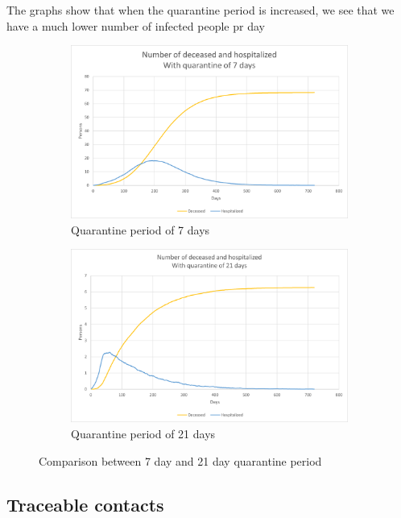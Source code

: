 The graphs show that when the quarantine period is increased, we see that we have a much lower number of infected people pr day




\begin{figure}[H]
\centering
\begin{subfigure}{.5\textwidth}
  \centering
  \includegraphics[width=.95\linewidth]{0_billeder/CT_HOS_7.png}
  \caption{Quarantine period of 7 days}
  \label{fig:sub1}
\end{subfigure}%
\begin{subfigure}{.5\textwidth}
  \centering
  \includegraphics[width=.95\linewidth]{0_billeder/CT_HOS_21.png}
  \caption{Quarantine period of 21 days}
  \label{fig:sub2}
\end{subfigure}
\caption{Comparison between 7 day and 21 day quarantine period}
\label{fig:test}
\end{figure}


\subsection{Traceable contacts}

